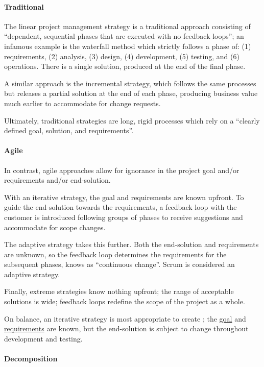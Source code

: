 \paragraph{Traditional}

The linear project management strategy is a traditional
approach consisting of \enquote{dependent, sequential
  phases that are executed with no feedback loops}; an
infamous example is the waterfall method which strictly
follows a phase of: (1) requirements, (2) analysis, (3)
design, (4) development, (5) testing, and (6) operations.
There is a single solution, produced at the end of the
final phase.

A similar approach is the incremental strategy, which
follows the same processes but releases a partial solution
at the end of each phase, producing business value much
earlier to accommodate for change requests.

Ultimately, traditional strategies are long, rigid
processes which rely on a \enquote{clearly defined goal,
  solution, and requirements}.

\paragraph{Agile}
In contrast, agile approaches allow for ignorance in the
project goal and/or requirements and/or end-solution.

With an iterative strategy, the goal and requirements are
known upfront.
To guide the end-solution towards the requirements, a
feedback loop with the customer is introduced following
groups of phases to receive suggestions and accommodate for
scope changes.

The adaptive strategy takes this further.
Both the end-solution and requirements are unknown, so the
feedback loop determines the requirements for the
subsequent phases, knows as \enquote{continuous change}.
Scrum is considered an adaptive strategy.

Finally, extreme strategies know nothing upfront; the range
of acceptable solutions is wide; feedback loops redefine
the scope of the project as a whole.

On balance, an iterative strategy is most appropriate to
create \projectname{}; the \hyperref[ss:goal]{goal} and
\hyperref[ss:requirements]{requirements} are known, but the
end-solution is subject to change throughout development
and testing.

\paragraph{Decomposition} \label{p:decomp}

